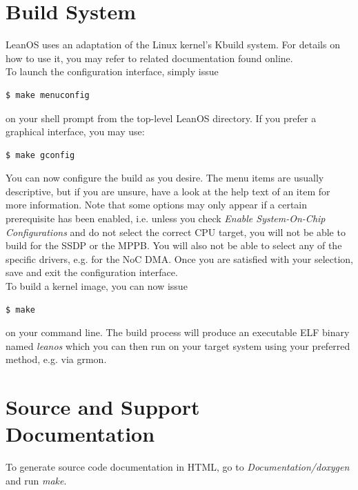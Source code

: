 \section {Build System}

LeanOS uses an adaptation of the Linux kernel's Kbuild system. For details on
how to use it, you may refer to related documentation found online. \\

\noindent
To launch the configuration interface, simply issue 

\begin{lstlisting}[language=bash]
  $ make menuconfig
\end{lstlisting}
\noindent
on your shell prompt from the top-level LeanOS directory. If you prefer a
graphical interface, you may use:

\begin{lstlisting}[language=bash]
  $ make gconfig
\end{lstlisting}

\noindent
You can now configure the build as you desire. The menu items are usually
descriptive, but if you are unsure, have a look at the help text of an item for
more information. Note that some options may only appear if a certain
prerequisite has been enabled, i.e. unless you check \emph{Enable
System-On-Chip Configurations} and do not select the correct CPU target, you
will not be able to build for the \gls{SSDP} or the \gls{MPPB}.  You will also
not be able to select any of the specific drivers, e.g. for the \gls{NoC}
\gls{DMA}. Once you are satisfied with your selection, save and exit the
configuration interface.\\

\noindent
To build a kernel image, you can now issue

\begin{lstlisting}[language=bash]
  $ make
\end{lstlisting}

\noindent
on your command line. The build process will produce an executable ELF binary
named \emph{leanos} which you can then run on your target system using your
preferred method, e.g. via grmon.



\section {Source and Support Documentation}

To generate source code documentation in HTML, go to \emph{Documentation/doxygen}
and run \emph{make}.

